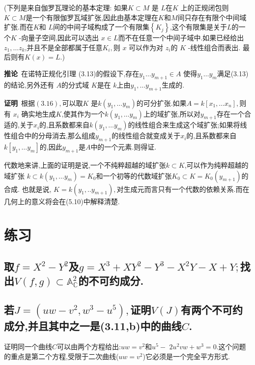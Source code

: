 \documentclass[UTF8]{book}
\begin{document}
		
		(下列是来自伽罗瓦理论的基本定理: 如果$K \subset M$ 是 $L$在$K$ 上的正规闭包则 $K \subset M$是一个有限伽罗瓦域扩张,因此由基本定理在$K$和$M$间只存在有限个中间域扩张.而在$K$和 $L$间的中间子域构成了一个有限集$\left\{ K _{ j }\right\}$,这个有限集是关于$ L $的一个$K$ -向量子空间,因此可以选出 $x \in L$而不在任意一个中间子域中.如果已经给出$z_{1}, \ldots z_{k}$,并且不是全部都属于任意$K _{ i },$则 $x$ 可以作为对 $z _{ i } $的 $K$ -线性组合而表出. 最后则有$K (x )= L$.)
		
		
		\textbf{推论}\  在诺特正规化引理 (3.13)的假设下,存在$y_{1} \ldots y_{m+1} \in A$ 使得$y_{1} \ldots y_{m}$满足(3.13)的结论,另外还有 $A$的分式域 $K$是在 $k$上由$y _{1}, \ldots y _{ m +1}$生成的.
		
		
		\textbf{证明}\ 根据$(3.16),$可以取$K$ 是$k \left(y _{1}, \ldots y _{ m }\right) $的可分扩张.如果$A = k \left[ x _{1}, \ldots x _{ n }\right],$则有 $x _{ i }$ 确实地生成$K$,使其作为一个$k \left(y _{1}, \ldots y _{ m }\right)$上的域扩张,所以对$y _{ m +1}$存在一个合适的,关于$x _{i}$的,且系数都来自$k \left(y _{1}, \ldots y _{ m }\right) $的线性组合来生成这个域扩张;如果将线性组合中的分母消去,那么组成$y _{ m +1}$的线性组合就变成关于$x _{i}$的,且系数都来自$k [  y _{1}, \ldots y _{ m } ] $的,因此$y _{ m +1}$是$ A $中的一个元素.则得证.
		
		
		代数地来讲,上面的证明是说,一个不纯粹超越的域扩张$k \subset K $,可以作为纯粹超越的域扩张 $k \subset k \left(y _{1}, \ldots y _{ m }\right)= K _{0}$和一个初等的代数域扩张$K _{0} \subset K = K _{0}\left(y _{ m +1}\right) $的合成. 也就是说, $K = k \left(y _{1}, . . y _{ m +1}\right),$对生成元而言只有一个代数的依赖关系.而在几何上的意义将会在(5.10)中解释清楚.
		
		
	\section*{练习}
		\subsection{取$f=X^{2}-Y^{2}$及$g=X^{3}+X Y^{2}-Y^{3}-X^{2} Y-X+Y ;$找出$V ( f , g ) \subset \mathbb{A} ^{2}_\mathbb{C}$的不可约成分.}
		
		\subsection{若$J =\left( uw - v ^{2}, w ^{3}- u ^{5}\right),$证明$V ( J )$有两个不可约成分,并且其中之一是(3.11,b)中的曲线$ C $.}
		证明同一个曲线$ C $可以由两个方程给出:$u w=v^{2}$和$u^{5}-$ $2 u^{2} v w+w^{3}=0 .$这个问题的重点是第二个方程,受限于二次曲线($u w=v^{2}$)它必须是一个完全平方形式.
		
\end{document}
